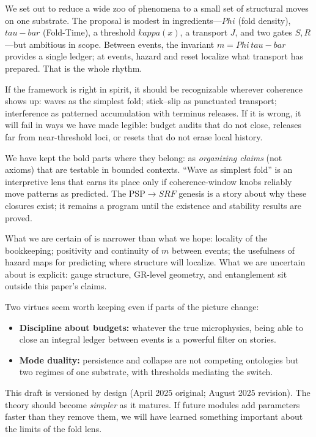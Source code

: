 \documentclass[12pt]{article}
\newcommand{\FoldDensity}{\Phi}
\newcommand{\FoldTime}{\bar{\tau}}
\newcommand{\Threshold}{\kappa}
\newcommand{\Survival}{S}
\newcommand{\Release}{R}
\newcommand{\SRF}{\mathcal{F}_{\mathrm{SR}}}
\def\FoldDensity{Phi}%
\def\FoldTime{tau-bar}%
\def\Threshold{kappa}%
\def\SRF{SRF}%
\def\Survival{S}%
\def\Release{R}%
\def\bar#1{#1}%
\def\mathcal#1{#1}%
\def\mathrm#1{#1}%
\begin{document}
We set out to reduce a wide zoo of phenomena to a small set of structural moves on one substrate. The proposal is modest in ingredients---$\FoldDensity$ (fold density), $\FoldTime$ (Fold-Time), a threshold $\Threshold(x)$, a transport $J$, and two gates $\Survival,\Release$---but ambitious in scope. Between events, the invariant $m=\FoldDensity\,\FoldTime$ provides a single ledger; at events, hazard and reset localize what transport has prepared. That is the whole rhythm.

If the framework is right in spirit, it should be recognizable wherever coherence shows up: waves as the simplest fold; stick--slip as punctuated transport; interference as patterned accumulation with terminus releases. If it is wrong, it will fail in ways we have made legible: budget audits that do not close, releases far from near-threshold loci, or resets that do not erase local history.

We have kept the bold parts where they belong: as \emph{organizing claims} (not axioms) that are testable in bounded contexts. ``Wave as simplest fold'' is an interpretive lens that earns its place only if coherence-window knobs reliably move patterns as predicted. The PSP$\to\SRF$ genesis is a story about why these closures exist; it remains a program until the existence and stability results are proved.

What we are certain of is narrower than what we hope: locality of the bookkeeping; positivity and continuity of $m$ between events; the usefulness of hazard maps for predicting where structure will localize. What we are uncertain about is explicit: gauge structure, GR-level geometry, and entanglement sit outside this paper's claims.

Two virtues seem worth keeping even if parts of the picture change:
\begin{itemize}
  \item \textbf{Discipline about budgets:} whatever the true microphysics, being able to close an integral ledger between events is a powerful filter on stories.
  \item \textbf{Mode duality:} persistence and collapse are not competing ontologies but two regimes of one substrate, with thresholds mediating the switch.
\end{itemize}

This draft is versioned by design (April 2025 original; August 2025 revision). The theory should become \emph{simpler} as it matures. If future modules add parameters faster than they remove them, we will have learned something important about the limits of the fold lens.
\end{document}
